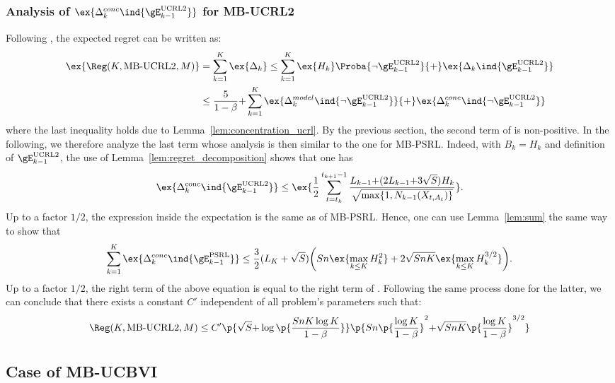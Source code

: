 \begin{subappendices}
\subsubsection{Analysis of $\ex{\Delta^{conc}_k\ind{\gE^\text{UCRL2}_{k-1}}}$ for MB-UCRL2}
Following , the expected regret can be written as:
\begin{align}
    \ex{\Reg(K,\text{MB-UCRL2},M)}
    &= \sum_{k=1}^K \ex{\Delta_k} \le \sum_{k=1}^{K}\ex{H_k}\Proba{\neg \gE^\text{UCRL2}_{k-1}} {+}\ex{\Delta_k \ind{\gE^\text{UCRL2}_{k-1}}} \nonumber \\
    &\le \frac{5}{1-\beta} {+} \sum_{k=1}^{K} \ex{\Delta^{model}_k\ind{\lnot\gE^\text{UCRL2}_{k-1}}} {+} \ex{\Delta^{conc}_k\ind{\lnot\gE^\text{UCRL2}_{k-1}}}
    \label{eq:proof_UCRL2_regret}
\end{align}
where the last inequality holds due to Lemma~\ref{lem:concentration_ucrl}.
By the previous section, the second term of  is non-positive.
In the following, we therefore analyze the last term whose analysis is then similar to the one for MB-PSRL.  Indeed, with $B_k=H_k$ and definition of $\gE_{k-1}^\text{UCRL2}$, the use of Lemma~\ref{lem:regret_decomposition} shows that one has
\begin{align*}
    \ex{\Delta^\text{conc}_k\ind{\gE_{k-1}^\text{UCRL2}}} \le \ex{\frac12 \sum_{t=t_k}^{t_{k+1}-1}\frac{L_{k-1} {+}(2L_{k-1} {+} 3\sqrt{S}) H_k}{\sqrt{\max\{1,N_{k-1}(X_{t,A_t})\} }}}.
\end{align*}
Up to a factor $1/2$, the expression inside the expectation is the same as  of MB-PSRL. Hence, one can use Lemma~\ref{lem:sum} the same way to show that
\begin{align*}
    \sum_{k=1}^{K} \ex{\Delta_k^{conc}\ind{\gE_{k-1}^\text{PSRL}}}
    \le \frac32(L_K+\sqrt{S})\bigg(Sn\ex{\max_{k\le K}H_k^2} +2\sqrt{SnK} \ex{\max_{k\le K}H_k^{3/2}}\bigg).
\end{align*}
Up to a factor $1/2$, the right term of the above equation is equal to the right term of . Following the same process done for the latter, we can conclude that there exists a constant $C'$ independent of all problem's parameters such that:
\begin{align*}
    \Reg(K,\text{MB-UCRL2},M) \le C'\p{\sqrt{S}{+}\log\p{\frac{SnK\log K}{1-\beta}}} \p{Sn\p{\frac{\log K}{1-\beta}}^{2}
    {+}\sqrt{SnK}\p{\frac{\log K}{1-\beta}}^{3/2} }
\end{align*}


\subsection{Case of MB-UCBVI}
\label{ssec:proof_UCBVI}


\end{subappendices}

